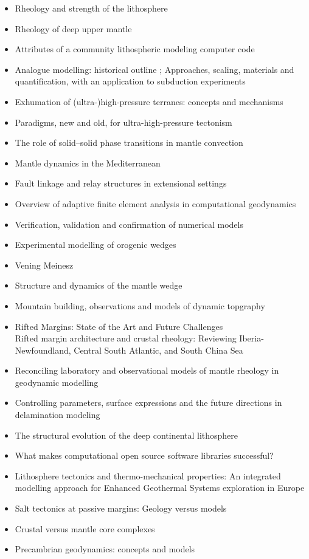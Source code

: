 \begin{itemize}
\item Rheology and strength of the lithosphere \cite{kirb83,buro11}
\item Rheology of deep upper mantle \cite{kara10}
\item Attributes of a community lithospheric modeling computer code \cite{comc15}
\item Analogue modelling: historical outline \cite{koyi97}; Approaches, scaling, materials and quantification, with an application to subduction experiments \cite{scst16}
\item Exhumation of (ultra-)high-pressure terranes: concepts and mechanisms \cite{warr13}
\item Paradigms, new and old, for ultra-high-pressure tectonism \cite{hage13}
\item The role of solid–solid phase transitions in mantle convection \cite{fada17}
\item Mantle dynamics in the Mediterranean \cite{faba14}
\item Fault linkage and relay structures in extensional settings \cite{foro16}
\item Overview of adaptive finite element analysis in computational geodynamics \cite{masm13}
\item Verification, validation and confirmation of numerical models \cite{orsb94}
\item Experimental modelling of orogenic wedges \cite{grmd12}
\item Vening Meinesz \cite{vlaa89}
\item Structure and dynamics of the mantle wedge \cite{vank03}
\item Mountain building, observations and models of dynamic topgraphy \cite{flgm13,fabc13}
\item Rifted Margins: State of the Art and Future Challenges \cite{pema19}\\
      Rifted margin architecture and crustal rheology: Reviewing
Iberia-Newfoundland, Central South Atlantic, and South China Sea \cite{brhc17}
\item Reconciling laboratory and observational models of mantle rheology in geodynamic modelling \cite{king16}



\item Controlling parameters, surface expressions and the future directions in delamination modeling \cite{goue18}
\item The structural evolution of the deep continental lithosphere \cite{comm17}
\item What makes computational open source software libraries successful? \cite{bahe13}
\item Lithosphere tectonics and thermo-mechanical properties: An integrated modelling
approach for Enhanced Geothermal Systems exploration in Europe \cite{clvz10}
\item Salt tectonics at passive margins: Geology versus models \cite{brfo11}
\item Crustal versus mantle core complexes \cite{brst18}
\item Precambrian geodynamics: concepts and models \cite{gery14}
\end{itemize}

